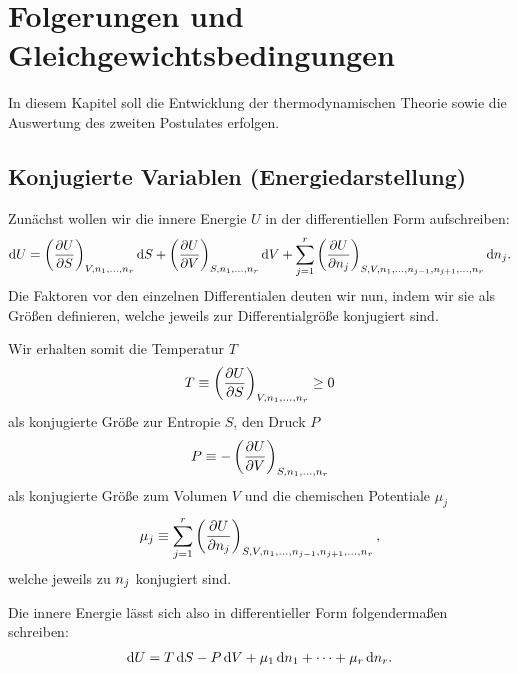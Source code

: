 
\chapter{Folgerungen und Gleichgewichtsbedingungen}

In diesem Kapitel soll die Entwicklung der thermodynamischen Theorie sowie die Auswertung des zweiten Postulates erfolgen.

\section{Konjugierte Variablen (Energiedarstellung)}

Zunächst wollen wir die innere Energie $U$ in der differentiellen Form aufschreiben:
\begin{align*}
    \mathop{}\!\mathrm{d} U = \left(\frac{\partial U}{\partial S}\right)_{V,n_1,\ldots,n_r} \mathop{}\!\mathrm{d} S + \left(\frac{\partial U}{\partial V}\right)_{S,n_1,\ldots,n_r} \mathop{}\!\mathrm{d} V + \sum_{j = 1}^r \left(\frac{\partial U}{\partial n_j}\right)_{S,V,n_1,\ldots,n_{j - 1},n_{j + 1},\ldots,n_r} \mathop{}\!\mathrm{d} n_j.
\end{align*}
Die Faktoren vor den einzelnen Differentialen deuten wir nun, indem wir sie als Größen definieren, welche jeweils zur Differentialgröße konjugiert sind.

Wir erhalten somit die Temperatur $T$
\begin{align}
    \label{eq:def_temperatur}
    T \equiv \left(\frac{\partial U}{\partial S}\right)_{V,n_1,\ldots,n_r} \geq 0
\end{align}
als konjugierte Größe zur Entropie $S$, den Druck $P$
\begin{align}
    \label{eq:def_druck}
    P \equiv -\left(\frac{\partial U}{\partial V}\right)_{S,n_1,\ldots,n_r}
\end{align}
als konjugierte Größe zum Volumen $V$ und die chemischen Potentiale $\mu_j$
\begin{align}
    \label{eq:def_chemische_potentiale}
    \mu_j \equiv \sum_{j = 1}^r \left(\frac{\partial U}{\partial n_j}\right)_{S,V,n_1,\ldots,n_{j - 1},n_{j + 1},\ldots,n_r},
\end{align}
welche jeweils zu $n_j$ konjugiert sind.

Die innere Energie lässt sich also in differentieller Form folgendermaßen schreiben:
\begin{align}
    \label{eq:innere_energie_differentielle_form}
    \mathop{}\!\mathrm{d} U = T\mathop{}\!\mathrm{d} S - P \mathop{}\!\mathrm{d} V + \mu_1 \mathop{}\!\mathrm{d} n_1 + \cdots + \mu_r \mathop{}\!\mathrm{d} n_r.
\end{align}

